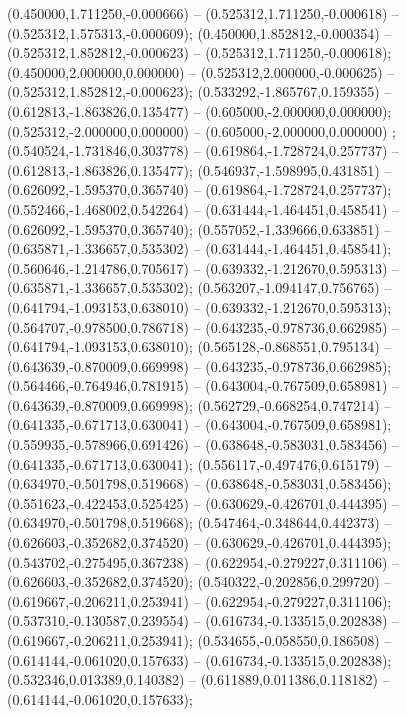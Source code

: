  (0.450000,1.711250,-0.000666) -- (0.525312,1.711250,-0.000618) -- (0.525312,1.575313,-0.000609);
 (0.450000,1.852812,-0.000354) -- (0.525312,1.852812,-0.000623) -- (0.525312,1.711250,-0.000618);
 (0.450000,2.000000,0.000000) -- (0.525312,2.000000,-0.000625) -- (0.525312,1.852812,-0.000623);
 (0.533292,-1.865767,0.159355) -- (0.612813,-1.863826,0.135477) -- (0.605000,-2.000000,0.000000);
 (0.525312,-2.000000,0.000000) -- (0.605000,-2.000000,0.000000) ;
 (0.540524,-1.731846,0.303778) -- (0.619864,-1.728724,0.257737) -- (0.612813,-1.863826,0.135477);
 (0.546937,-1.598995,0.431851) -- (0.626092,-1.595370,0.365740) -- (0.619864,-1.728724,0.257737);
 (0.552466,-1.468002,0.542264) -- (0.631444,-1.464451,0.458541) -- (0.626092,-1.595370,0.365740);
 (0.557052,-1.339666,0.633851) -- (0.635871,-1.336657,0.535302) -- (0.631444,-1.464451,0.458541);
 (0.560646,-1.214786,0.705617) -- (0.639332,-1.212670,0.595313) -- (0.635871,-1.336657,0.535302);
 (0.563207,-1.094147,0.756765) -- (0.641794,-1.093153,0.638010) -- (0.639332,-1.212670,0.595313);
 (0.564707,-0.978500,0.786718) -- (0.643235,-0.978736,0.662985) -- (0.641794,-1.093153,0.638010);
 (0.565128,-0.868551,0.795134) -- (0.643639,-0.870009,0.669998) -- (0.643235,-0.978736,0.662985);
 (0.564466,-0.764946,0.781915) -- (0.643004,-0.767509,0.658981) -- (0.643639,-0.870009,0.669998);
 (0.562729,-0.668254,0.747214) -- (0.641335,-0.671713,0.630041) -- (0.643004,-0.767509,0.658981);
 (0.559935,-0.578966,0.691426) -- (0.638648,-0.583031,0.583456) -- (0.641335,-0.671713,0.630041);
 (0.556117,-0.497476,0.615179) -- (0.634970,-0.501798,0.519668) -- (0.638648,-0.583031,0.583456);
 (0.551623,-0.422453,0.525425) -- (0.630629,-0.426701,0.444395) -- (0.634970,-0.501798,0.519668);
 (0.547464,-0.348644,0.442373) -- (0.626603,-0.352682,0.374520) -- (0.630629,-0.426701,0.444395);
 (0.543702,-0.275495,0.367238) -- (0.622954,-0.279227,0.311106) -- (0.626603,-0.352682,0.374520);
 (0.540322,-0.202856,0.299720) -- (0.619667,-0.206211,0.253941) -- (0.622954,-0.279227,0.311106);
 (0.537310,-0.130587,0.239554) -- (0.616734,-0.133515,0.202838) -- (0.619667,-0.206211,0.253941);
 (0.534655,-0.058550,0.186508) -- (0.614144,-0.061020,0.157633) -- (0.616734,-0.133515,0.202838);
 (0.532346,0.013389,0.140382) -- (0.611889,0.011386,0.118182) -- (0.614144,-0.061020,0.157633);
